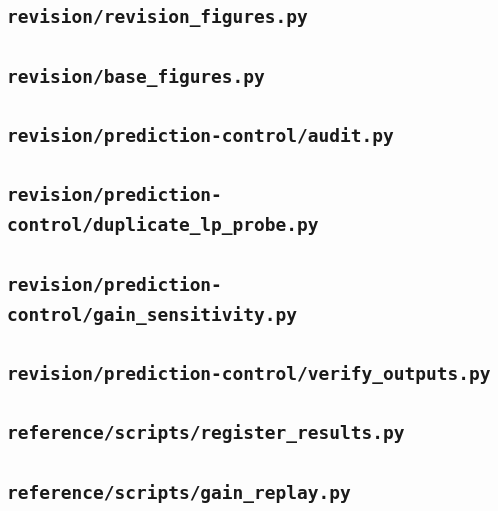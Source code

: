 
\subsection*{\texttt{revision/revision\_figures.py}}


\subsection*{\texttt{revision/base\_figures.py}}


\subsection*{\texttt{revision/prediction-control/audit.py}}


\subsection*{\texttt{revision/prediction-control/duplicate\_lp\_probe.py}}


\subsection*{\texttt{revision/prediction-control/gain\_sensitivity.py}}


\subsection*{\texttt{revision/prediction-control/verify\_outputs.py}}


\subsection*{\texttt{reference/scripts/register\_results.py}}


\subsection*{\texttt{reference/scripts/gain\_replay.py}}

